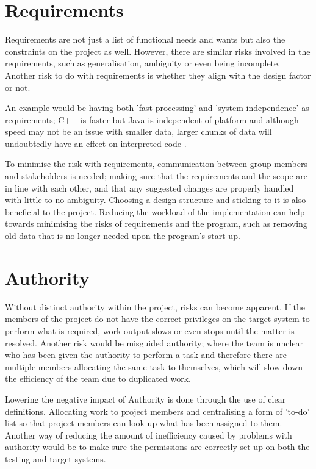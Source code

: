 \section{Requirements}
Requirements are not just a list of functional needs and wants but also the
constraints on the project as well. However, there are similar risks involved
in the requirements, such as generalisation, ambiguity or even being incomplete.
Another risk to do with requirements is whether they align with the design
factor or not.

An example would be having both 'fast processing' and 'system independence' as 
requirements; C++ is faster but Java is independent of platform and although 
speed may not be an issue with smaller data, larger chunks of data will 
undoubtedly have an effect on interpreted code \cite{javaCbenchmark}.

To minimise the risk with requirements, communication between group members and
stakeholders is needed; making sure that the requirements and the scope are in
line with each other, and that any suggested changes are properly handled with
little to no ambiguity. Choosing a design structure and sticking to it is also
beneficial to the project. Reducing the workload of the implementation can
help towards minimising the risks of requirements and the program, such as
removing old data that is no longer needed upon the program's start-up.

\section{Authority}
Without distinct authority within the project, risks can become apparent. If the 
members of the project do not have the correct privileges on the target system 
to perform what is required, work output slows or even stops until the matter is 
resolved. Another risk would be misguided authority; where the team is unclear 
who has been given the authority to perform a task and therefore there are 
multiple members allocating the same task to themselves, which will slow down 
the efficiency of the team due to duplicated work.

Lowering the negative impact of Authority is done through the use of clear
definitions. Allocating work to project members and centralising a form of
'to-do' list so that project members can look up what has been assigned to them.
Another way of reducing the amount of inefficiency caused by problems with
authority would be to make sure the permissions are correctly set up on both the
testing and target systems.


